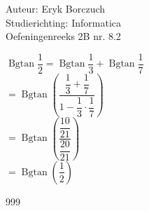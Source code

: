 \documentclass[a4paper]{article}
\begin{document}
  
\noindent \large Auteur: Eryk Borczuch \\
\noindent \large Studierichting: Informatica\\
\noindent \large Oefeningenreeks 2B nr. 8.2\\

\newcommand{\Bgtan}{\operatorname{Bgtan}}

\medskip

\normalsize

$\Bgtan\dfrac{1}{2} = \Bgtan\dfrac{1}{3} + \Bgtan\dfrac{1}{7}$\\

$= \Bgtan\left(\dfrac{\dfrac{1}{3}+\dfrac{1}{7}}{1-\dfrac{1}{3}\cdot\dfrac{1}{7}}\right)$\\

$=\Bgtan \left(\dfrac{\dfrac{10}{21}}{\dfrac{20}{21}}\right)$\\

$= \Bgtan\left(\dfrac{1}{2}\right)$

\begin{thebibliography}{999}
\end{thebibliography}
\end{document}
